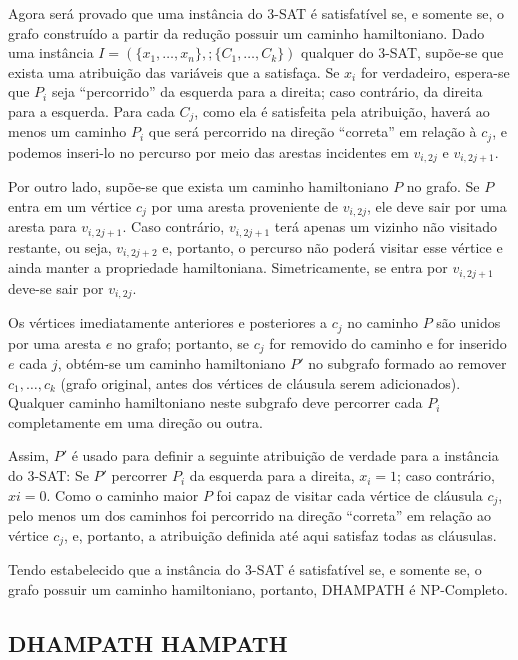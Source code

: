 Agora será provado que uma instância do 3-SAT é satisfatível se, e somente se, o grafo construído a partir da redução possuir um caminho hamiltoniano. Dado uma instância $I=(\{x_1,\ldots,x_n\},;\{C_1,\ldots,C_k\})$ qualquer do 3-SAT, supõe-se que exista uma atribuição das variáveis que a satisfaça. Se $x_i$ for verdadeiro, espera-se que $P_i$ seja ``percorrido'' da esquerda para a direita; caso contrário, da direita para a esquerda. Para cada $C_j$, como ela é satisfeita pela atribuição, haverá ao menos um caminho $P_i$ que será percorrido na direção ``correta'' em relação à $c_j$, e podemos inseri-lo no percurso por meio das arestas incidentes em $v_{i,2j}$ e $v_{i,2j+1}$.

Por outro lado, supõe-se que exista um caminho hamiltoniano $P$ no grafo. Se $P$ entra em um vértice $c_j$ por uma aresta proveniente de $v_{i,2j}$, ele deve sair por uma aresta para $v_{i,2j+1}$. Caso contrário, $v_{i,2j+1}$ terá apenas um vizinho não visitado restante, ou seja, $v_{i,2j+2}$ e, portanto, o percurso não poderá visitar esse vértice e ainda manter a propriedade hamiltoniana. Simetricamente, se entra por $v_{i,2j+1}$ deve-se sair por $v_{i,2j}$.

Os vértices imediatamente anteriores e posteriores a $c_j$ no caminho $P$ são unidos por uma aresta $e$ no grafo; portanto, se $c_j$ for removido do caminho e for inserido $e$ cada $j$, obtém-se um caminho hamiltoniano $P'$ no subgrafo formado ao remover $c_1,\ldots,c_k$ (grafo original, antes dos vértices de cláusula serem adicionados). Qualquer caminho hamiltoniano neste subgrafo deve percorrer cada $P_i$ completamente em uma direção ou outra.

Assim, $P'$ é usado para definir a seguinte atribuição de verdade para a instância do 3-SAT: Se $P'$ percorrer $P_i$ da esquerda para a direita, $x_i = 1$; caso contrário, $xi = 0$. Como o caminho maior $P$ foi capaz de visitar cada vértice de cláusula $c_j$, pelo menos um dos caminhos foi percorrido na direção “correta” em
relação ao vértice $c_j$, e, portanto, a atribuição definida até aqui satisfaz todas as cláusulas. 

Tendo estabelecido que a instância do 3-SAT é satisfatível se, e somente se, o grafo possuir um caminho hamiltoniano, portanto, DHAMPATH é NP-Completo.


\subsection{DHAMPATH \reduct HAMPATH}

